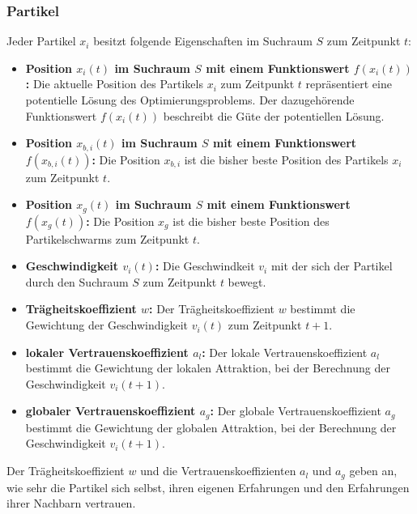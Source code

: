 \documentclass[a4paper, 11pt]{article}
\begin{document}
\subsubsection{Partikel}
Jeder Partikel $x_{i}$ besitzt folgende Eigenschaften im Suchraum $S$ zum Zeitpunkt $t$:
\begin{itemize}
	\item \textbf{Position $x_{i}(t)$ im Suchraum $S$ mit einem Funktionswert $f(x_{i}(t))$:} Die aktuelle Position des Partikels $x_{i}$ zum Zeitpunkt $t$ repräsentiert eine potentielle Lösung des Optimierungsproblems. Der dazugehörende Funktionswert $f(x_{i}(t))$ beschreibt die Güte der potentiellen Lösung.
	\item \textbf{Position $x_{b,i}(t)$ im Suchraum $S$ mit einem Funktionswert $f(x_{b,i}(t))$:} Die Position $x_{b,i}$ ist die bisher beste Position des Partikels $x_{i}$ zum Zeitpunkt $t$.
	\item \textbf{Position $x_{g}(t)$ im Suchraum $S$ mit einem Funktionswert $f(x_{g}(t))$:} Die Position $x_{g}$ ist die bisher beste Position des Partikelschwarms zum Zeitpunkt $t$.
	\item \textbf{Geschwindigkeit $v_{i}(t)$:} Die Geschwindkeit $v_{i}$ mit der sich der Partikel durch den Suchraum $S$ zum Zeitpunkt $t$ bewegt.
	\item \textbf{Trägheitskoeffizient $w$:} Der Trägheitskoeffizient $w$ bestimmt die Gewichtung der Geschwindigkeit $v_{i}(t)$ zum Zeitpunkt $t+1$.
	\item \textbf{lokaler Vertrauenskoeffizient $a_{l}$:} Der lokale Vertrauenskoeffizient $a_{l}$ bestimmt die Gewichtung der lokalen Attraktion, bei der Berechnung der Geschwindigkeit $v_{i}(t+1)$.
	\item \textbf{globaler Vertrauenskoeffizient $a_{g}$:} Der globale Vertrauenskoeffizient $a_{g}$ bestimmt die Gewichtung der globalen Attraktion, bei der Berechnung der Geschwindigkeit $v_{i}(t+1)$.
\end{itemize}
Der Trägheitskoeffizient $w$ und die Vertrauenskoeffizienten $a_{l}$ und $a_{g}$ geben an, wie sehr die Partikel sich selbst, ihren eigenen Erfahrungen und den Erfahrungen ihrer Nachbarn vertrauen.
\newpage
\end{document}
